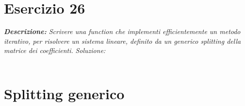 \section{Esercizio 26}
\textit{\textbf{Descrizione:}  Scrivere una function che implementi efficientemente un metodo iterativo, per risolvere un sistema lineare, definito da un generico splitting della matrice dei coefficienti.}\newline
\emph{Soluzione: }\\~\\
\section{Splitting generico}
\newpage